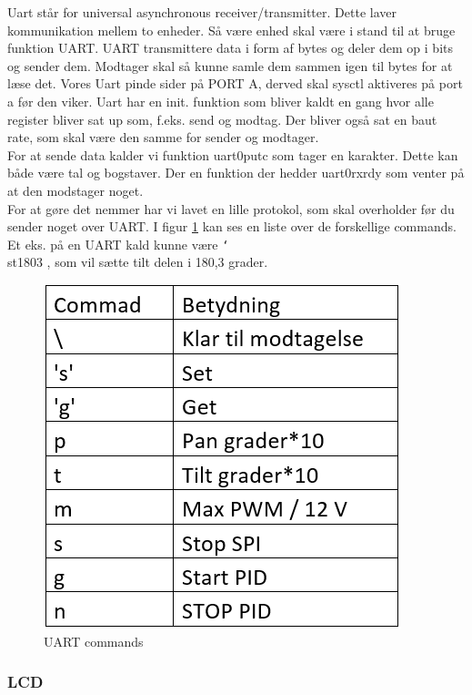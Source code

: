 Uart står for universal asynchronous receiver/transmitter. Dette laver kommunikation mellem to enheder. Så være enhed skal være i stand til at bruge funktion UART. UART transmittere data i form af bytes og deler dem op i bits og sender dem. Modtager skal så kunne samle dem sammen igen til bytes for at læse det.
Vores Uart pinde sider på PORT A, derved skal sysctl aktiveres på port a før den viker. Uart har en init. funktion som bliver kaldt en gang hvor alle register bliver sat up som, f.eks. send og modtag. Der bliver også sat en baut rate, som skal være den samme for sender og modtager.
\\
For at sende data kalder vi funktion uart0\textunderscore putc som tager en karakter. Dette kan både være tal og bogstaver. Der en funktion der hedder uart0\textunderscore rx\textunderscore rdy som venter på at den modstager noget.
\\
For at gøre det nemmer har vi lavet en lille protokol, som skal overholder før du sender noget over UART. I figur \ref{fig:UARTCMD} kan ses en liste over de forskellige commands. Et eks. på en UART kald kunne være \texttt{\char`\\}st1803 , som vil sætte tilt delen i 180,3 grader.

\begin{figure}[ht]
			\begin{center}
			\includegraphics[scale=0.5]{Billeder/UARTCMD.png}
			\end{center}
			\caption{UART commands}
			\label{fig:UARTCMD}
\end{figure}

\subsubsection{LCD}

